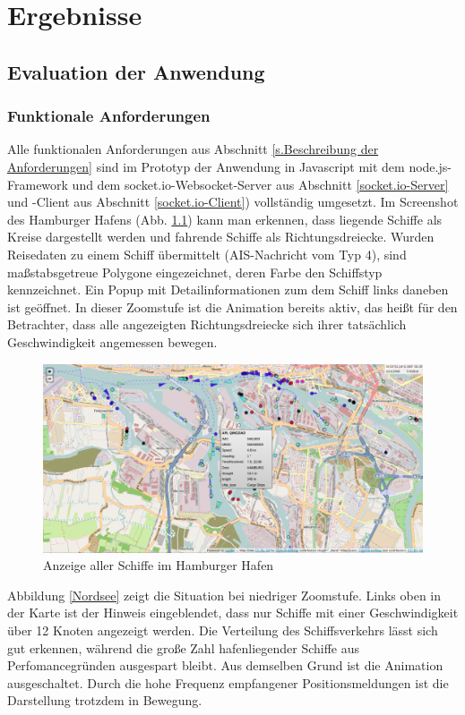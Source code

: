 \chapter{Ergebnisse}\label{Ergebnisse}

\section{Evaluation der Anwendung}\label{Evaluation der Anwendung}
\subsection{Funktionale Anforderungen}
Alle funktionalen Anforderungen aus Abschnitt \ref{s.Beschreibung der Anforderungen} sind im Prototyp der Anwendung in Javascript mit dem node.js-Framework und dem socket.io-Websocket-Server aus Abschnitt \ref{socket.io-Server} und -Client aus Abschnitt \ref{socket.io-Client}) vollständig umgesetzt. Im Screenshot des Hamburger Hafens (Abb. \ref{Hafen Hamburg}) kann man erkennen, dass liegende Schiffe als Kreise dargestellt werden und fahrende Schiffe als Richtungsdreiecke. Wurden Reisedaten zu einem Schiff übermittelt (AIS-Nachricht vom Typ 4), sind maßstabsgetreue Polygone eingezeichnet, deren Farbe den Schiffstyp kennzeichnet.
Ein Popup mit Detailinformationen zum dem Schiff links daneben ist geöffnet. In dieser Zoomstufe ist die Animation bereits aktiv, das heißt für den Betrachter, dass alle angezeigten Richtungsdreiecke sich ihrer tatsächlich Geschwindigkeit angemessen bewegen.

\begin {figure}[H]
\begin{center}
  \includegraphics[width=6in]{images/Hamburg.png}
\end{center}
\caption{Anzeige aller Schiffe im Hamburger Hafen}
\label{Hafen Hamburg}
\end {figure}
Abbildung \ref{Nordsee} zeigt die Situation bei niedriger Zoomstufe. Links oben in der Karte ist der Hinweis eingeblendet, dass nur Schiffe mit einer Geschwindigkeit über 12 Knoten angezeigt werden. Die Verteilung des Schiffsverkehrs lässt sich gut erkennen, während die große Zahl hafenliegender Schiffe aus Perfomancegründen ausgespart bleibt. Aus demselben Grund ist die Animation ausgeschaltet. Durch die hohe Frequenz empfangener Positionsmeldungen ist die Darstellung trotzdem in Bewegung.

